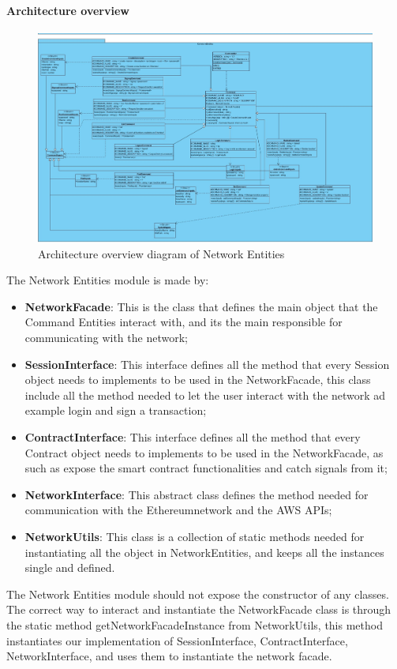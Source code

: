 \paragraph{Architecture overview}
\begin{figure}[h]
	\centering
	\includegraphics[width=\textwidth]{./res/img/NetworkFacade.png}
	\caption{Architecture overview diagram of Network Entities}
\end{figure}
The Network Entities module is made by:
\begin{itemize}
    \item \textbf{NetworkFacade}: This is the class that defines the main object that the Command Entities interact with, and its the main responsible for communicating with the network;
    \item \textbf{SessionInterface}: This interface defines all the method that every Session object needs to implements to be used in the NetworkFacade, this class include all the method needed to let the user interact with the network ad example login and sign a transaction;
    \item \textbf{ContractInterface}: This interface defines all the method that every Contract object needs to implements to be used in the NetworkFacade, as such as expose the smart contract functionalities and catch signals from it;
    \item \textbf{NetworkInterface}: This abstract class defines the method needed for communication with the Ethereum\glo network and the AWS APIs;
    \item \textbf{NetworkUtils}: This class is a collection of static methods needed for instantiating all the object in NetworkEntities, and keeps all the instances single and defined.
\end{itemize}
The Network Entities module should not expose the constructor of any classes.
The correct way to interact and instantiate the NetworkFacade class is through the static method getNetworkFacadeInstance from NetworkUtils,
this method instantiates our implementation of SessionInterface, ContractInterface, NetworkInterface, and uses them to instantiate the network facade.
